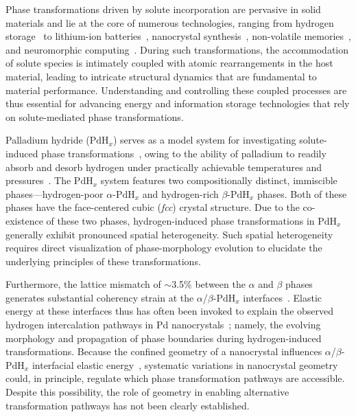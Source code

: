 \documentclass[reprint,amsmath,amssymb,aip,nofootinbib, citeautoscript,]{revtex4-2}
\begin{document}
Phase transformations driven by solute incorporation are pervasive in solid materials and lie at the core of numerous technologies, ranging from hydrogen storage~\cite{pundt_hydrogen_2004, griessen_thermodynamics_2016} to lithium-ion batteries~\cite{cogswell_theory_2013,sood_electrochemical_2021}, nanocrystal synthesis~\cite{son_cation_2004,rivest_cation_2013}, non-volatile memories~\cite{lu_electric_2017,huang_electrolyte_2019}, and neuromorphic computing~\cite{zhu_ionic_2019,nadkarni_modeling_2019}. During such transformations, the accommodation of solute species is intimately coupled with atomic rearrangements in the host material, leading to intricate structural dynamics that are fundamental to material performance. Understanding and controlling these coupled processes are thus essential for advancing energy and information storage technologies that rely on solute-mediated phase transformations.


Palladium hydride ($\mathrm{PdH}_x$) serves as a model system for investigating solute-induced phase transformations~\cite{baldi_in_situ_2014,ulvestad_self_2017}, owing to the ability of palladium to readily absorb and desorb hydrogen under practically achievable temperatures and pressures~\cite{baldi_in_situ_2014,wicke_hydrogen_1978,dekura_hydrogen_2019}. The $\mathrm{PdH}_x$ system features two compositionally distinct, immiscible phases—hydrogen-poor $\alpha$-$\mathrm{PdH}_x$ and hydrogen-rich $\beta$-$\mathrm{PdH}_x$ phases. Both of these phases have the face-centered cubic (\textit{fcc}) crystal structure. Due to the co-existence of these two phases, hydrogen-induced phase transformations in $\mathrm{PdH}_x$ generally exhibit pronounced spatial heterogeneity. Such spatial heterogeneity requires direct visualization of phase-morphology evolution to elucidate the underlying principles of these transformations.


Furthermore, the lattice mismatch of $\sim$3.5\% between the $\alpha$ and $\beta$ phases~\cite{wicke_hydrogen_1978,wyckoff_structure_1924} generates substantial coherency strain at the $\alpha$/$\beta$-$\mathrm{PdH}_x$ interfaces~\cite{syrenova_hydride_2015,ulvestad_three_2017}. Elastic energy at these interfaces thus has often been invoked to explain the observed hydrogen intercalation pathways in Pd nanocrystals~\cite{ulvestad_three_2017,narayan_direct_2017,angell_lattice_2022,lee_atomic_2024}; namely, the evolving morphology and propagation of phase boundaries during hydrogen-induced transformations. Because the confined geometry of a nanocrystal influences $\alpha$/$\beta$-$\mathrm{PdH}_x$ interfacial elastic energy~\cite{ulvestad_three_2017,lee_atomic_2024}, systematic variations in nanocrystal geometry could, in principle, regulate which phase transformation pathways are accessible. Despite this possibility, the role of geometry in enabling alternative transformation pathways has not been clearly established.
\end{document}
